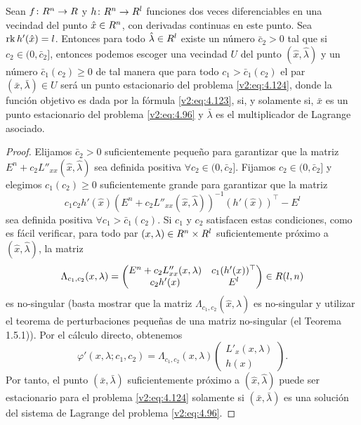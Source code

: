 \begin{lemma}\label{v2:lem:4.4.1}
    Sean $f \colon R^n \to R$ y $h \colon R^n \to R^l$ funciones dos veces diferenciables en una vecindad del punto $\hat{x} \in R^n$, con derivadas continuas en este punto. Sea $\operatorname{rk} h'(\hat{x}) = l$.
    Entonces para todo $\hat{\lambda} \in R^l$ existe un número $\bar{c}_2 > 0$ tal que si $c_2 \in (0, \bar{c}_2]$, entonces podemos escoger una vecindad $U$ del punto $(\hat{x}, \hat{\lambda})$ y un número $\bar{c}_1(c_2) \ge 0$ de tal manera que para todo $c_1 > \bar{c}_1(c_2)$ el par $(\bar{x}, \bar{\lambda}) \in U$ será un punto estacionario del problema \eqref{v2:eq:4.124}, donde la función objetivo es dada por la fórmula \eqref{v2:eq:4.123}, si, y solamente si, $\bar{x}$ es un punto estacionario del problema \eqref{v2:eq:4.96} y $\bar{\lambda}$ es el multiplicador de Lagrange asociado.
\end{lemma}
\begin{proof}
    Elijamos $\bar{c}_2 > 0$ suficientemente pequeño para garantizar que la matriz $E^n + c_2 L''_{xx}(\hat{x}, \hat{\lambda})$ sea definida positiva $\forall c_2 \in (0, \bar{c}_2]$. Fijamos $c_2 \in (0, \bar{c}_2]$ y elegimos $c_1(c_2) \ge 0$ suficientemente grande para garantizar que la matriz
    \[
        c_1 c_2 h'(\hat{x})(E^n + c_2 L''_{xx}(\hat{x}, \hat{\lambda}))^{-1}(h'(\hat{x}))^\top - E^l
    \]
    sea definida positiva $\forall c_1 > \bar{c}_1(c_2)$. Si $c_1$ y $c_2$ satisfacen estas condiciones, como es fácil verificar, para todo par $(x, \lambda) \in R^n \times R^l$ suficientemente próximo a $(\hat{x}, \hat{\lambda})$, la matriz
    \[
        \Lambda_{c_1, c_2}(x, \lambda) = \begin{pmatrix} E^n + c_2 L''_{xx}(x, \lambda) & c_1 (h'(x))^\top \\ c_2 h'(x) & E^l \end{pmatrix} \in R(l, n)
    \]
    es no-singular (basta mostrar que la matriz $\Lambda_{c_1, c_2}(\hat{x}, \hat{\lambda})$ es no-singular y utilizar el teorema de perturbaciones pequeñas de una matriz no-singular (el Teorema 1.5.1)). Por el cálculo directo, obtenemos
    \[
        \varphi'(x, \lambda; c_1, c_2) = \Lambda_{c_1, c_2}(x, \lambda) \begin{pmatrix} L'_x(x, \lambda) \\ h(x) \end{pmatrix}.
    \]
    Por tanto, el punto $(\bar{x}, \bar{\lambda})$ suficientemente próximo a $(\hat{x}, \hat{\lambda})$ puede ser estacionario para el problema \eqref{v2:eq:4.124} solamente si $(\bar{x}, \bar{\lambda})$ es una solución del sistema de Lagrange del problema \eqref{v2:eq:4.96}.
\end{proof}

